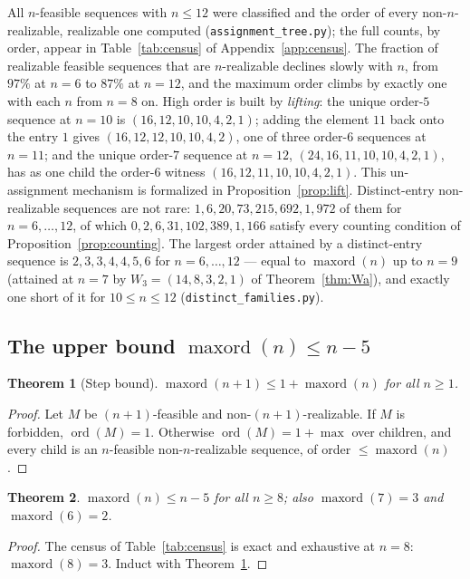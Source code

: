 \documentclass[11pt]{article}
\newtheorem{theorem}{Theorem}[section]
\theoremstyle{definition}
\theoremstyle{remark}
\newcommand{\ord}{\operatorname{ord}}
\newcommand{\maxord}{\operatorname{maxord}}
\begin{document}
All $n$-feasible sequences with $n\le12$ were classified and the order of every
non-$n$-realizable, realizable one computed (\texttt{assignment\_tree.py}); the full
counts, by order, appear in Table~\ref{tab:census} of Appendix~\ref{app:census}.
The fraction of realizable feasible sequences that are $n$-realizable declines
slowly with $n$, from $97\%$ at $n=6$ to $87\%$ at $n=12$, and the maximum order
climbs by exactly one with each $n$ from $n=8$ on. High order is built
by \emph{lifting}: the unique order-$5$ sequence at $n=10$ is
$(16,12,10,10,4,2,1)$; adding the element $11$ back onto the entry $1$ gives
$(16,12,12,10,10,4,2)$, one of three order-$6$ sequences at $n=11$; and the unique
order-$7$ sequence at $n=12$, $(24,16,11,10,10,4,2,1)$, has as one child the
order-$6$ witness $(16,12,11,10,10,4,2,1)$. This un-assignment mechanism is
formalized in Proposition~\ref{prop:lift}. Distinct-entry non-realizable sequences
are not rare: $1,6,20,73,215,692,1{,}972$ of them for $n=6,\dots,12$, of which
$0,2,6,31,102,389,1{,}166$ satisfy every counting condition of
Proposition~\ref{prop:counting}. The largest order attained by a distinct-entry
sequence is $2,3,3,4,4,5,6$ for $n=6,\dots,12$ --- equal to $\maxord(n)$ up to
$n=9$ (attained at $n=7$ by $W_3=(14,8,3,2,1)$ of Theorem~\ref{thm:Wa}), and
exactly one short of it for $10\le n\le12$ (\texttt{distinct\_families.py}).

\subsection{The upper bound $\maxord(n)\le n-5$}

\begin{theorem}[Step bound]\label{thm:step}
$\maxord(n+1)\le1+\maxord(n)$ for all $n\ge1$.
\end{theorem}

\begin{proof}
Let $M$ be $(n{+}1)$-feasible and non-$(n{+}1)$-realizable. If $M$ is forbidden,
$\ord(M)=1$. Otherwise $\ord(M)=1+\max$ over children, and every child is an
$n$-feasible non-$n$-realizable sequence, of order $\le\maxord(n)$.
\end{proof}

\begin{theorem}\label{thm:upper}
$\maxord(n)\le n-5$ for all $n\ge8$; also $\maxord(7)=3$ and $\maxord(6)=2$.
\end{theorem}

\begin{proof}
The census of Table~\ref{tab:census} is exact and exhaustive at $n=8$:
$\maxord(8)=3$. Induct with Theorem~\ref{thm:step}.
\end{proof}
\end{document}
